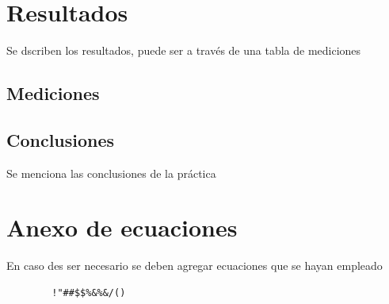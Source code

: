 \documentclass[letterpaper,12pt]{extarticle}%
\begin{document}
    	
    \section{Resultados}
    Se dscriben los resultados, puede ser a través de una tabla de mediciones
	\subsection{Mediciones}

	\begin{multicols}{2}
	    
	    \section{Conclusiones}

Se menciona las conclusiones de la práctica	    
%            
    \end{multicols}
    
	\newpage
	
	\section{Anexo de ecuaciones}
	
	En caso des ser necesario se deben agregar ecuaciones que se hayan empleado

	\begin{verbatim}
		!"##$$%&%&/()
	\end{verbatim}

	\cfoot{\LaTeX}
\end{document}
